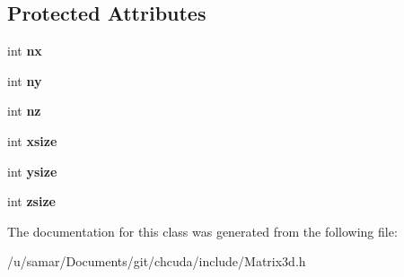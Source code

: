\subsection*{Protected Attributes}
\begin{DoxyCompactItemize}
\item 
\hypertarget{classMatrix3d_a3f51885c4443ba1b49973167bd70ba5a}{}\label{classMatrix3d_a3f51885c4443ba1b49973167bd70ba5a} 
int {\bfseries nx}
\item 
\hypertarget{classMatrix3d_a006c9a3a7ec1ae18e32536a22e13e8fe}{}\label{classMatrix3d_a006c9a3a7ec1ae18e32536a22e13e8fe} 
int {\bfseries ny}
\item 
\hypertarget{classMatrix3d_a066681c25c06add097736316470ee4e2}{}\label{classMatrix3d_a066681c25c06add097736316470ee4e2} 
int {\bfseries nz}
\item 
\hypertarget{classMatrix3d_a7ae88ff46c6e20f95faa1ffc76804c06}{}\label{classMatrix3d_a7ae88ff46c6e20f95faa1ffc76804c06} 
int {\bfseries xsize}
\item 
\hypertarget{classMatrix3d_a42f5e7f9d870544bd8e0d9c3cc41a699}{}\label{classMatrix3d_a42f5e7f9d870544bd8e0d9c3cc41a699} 
int {\bfseries ysize}
\item 
\hypertarget{classMatrix3d_adc57dfb65c173d37208f42f1538c695d}{}\label{classMatrix3d_adc57dfb65c173d37208f42f1538c695d} 
int {\bfseries zsize}
\end{DoxyCompactItemize}


The documentation for this class was generated from the following file\+:\begin{DoxyCompactItemize}
\item 
/u/samar/\+Documents/git/chcuda/include/Matrix3d.\+h\end{DoxyCompactItemize}
